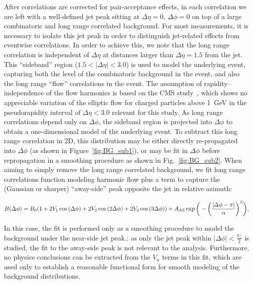 After correlations are corrected for pair-acceptance effects, in each correlation we are left with a well-defined jet peak sitting at $\Delta\eta = 0$, $\Delta\phi = 0$ on top of a large combinatoric and long range correlated background.  For most measurements, it is necessary to isolate this jet peak in order to distinguish jet-related effects from eventwise correlations.   In order to achieve this, we note that the long range correlation is independent of $\Delta\eta$ at distances larger than $\Delta\eta = 1.5$ from the jet.  This ``sideband'' region ($1.5 < |\Delta\eta| < 3.0$) is used to model the underlying event, capturing both the level of the combinatoric background in the event, and also the long range ``flow'' correlations in the event.  The assumption of rapidity--independence of the flow harmonics is based on the CMS study~\cite{v2_HIN_11_012}, which shows no appreciable variation of the elliptic flow for charged particles above 1~GeV in the pseudorapidity interval of $\Delta\eta < 3.0$ relevant for this study.  As long range correlations depend only on $\Delta\phi$, the sideband region is projected into $\Delta\phi$ to obtain a one-dimensional model of the underlying event.   To subtract this long range correlation in 2D, this distribution may be either directly re-propagated into $\Delta\phi$ (as shown in Figure~\ref{fig:BG_sub1}), or may be fit in $\Delta\phi$ before repropagation in a smoothing procedure as shown in Fig.~\ref{fig:BG_sub2}.  When aiming to simply remove the long range correlated background, we fit long range correlations function modeling harmonic flow plus a term to capture the (Gaussian or sharper) ``away-side'' peak opposite the jet in relative azimuth:  

\begin{equation}
\label{eq:bkg_fit_as}
B(\Delta\phi) = B_{0}(1+2V_{\rm1}\cos{(\Delta\phi)}+2V_{\rm 2}\cos{(2\Delta\phi)}+2V_{\rm 3}\cos{(3\Delta\phi)})+A_{\rm AS}\exp{\bigg(-\bigg(\frac{|\Delta\phi-\pi|}{\alpha}\bigg)^{\beta} \bigg) },
\end{equation}

\noindent In this case, the fit is performed only as a smoothing procedure to model the background under the near-side jet peak.; as only the jet peak within $|\Delta\phi|<\frac{\pi/}{2}$ is studied, the fit to the away-side peak is not relevant to the analysis.  Furthermore, no physics conclusions can be extracted from the $V_{n}$ terms in this fit, which are used only to establish a reasonable functional form for smooth modeling of the background distributions.  

